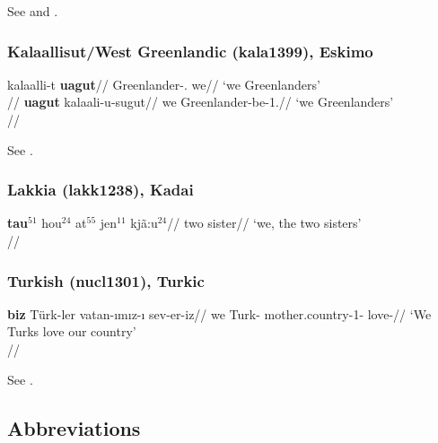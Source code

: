 \documentclass[A4paper]{article}
\begin{document}
See \citet[284; 292]{sohn1994} and \citet[151--154]{choi2014phd}.


\subsubsection{Kalaallisut/West Greenlandic (kala1399), Eskimo}


\pex
\a
\begingl
\gla kalaalli-t \textbf{uagut}//
\glb Greenlander-\Abs{}.\Pl{} we//
\glft `we Greenlanders'\\{\citep[after][110; gloss extrapolated]{fortescue1984}}//
\endgl
\a
\begingl
\gla \textbf{uagut} kalaali-u-sugut//
\glb we Greenlander-be-1\Pl{}.\Ptcp{}//
\glft `we Greenlanders' \\{\citep[after][257]{fortescue1984}}//
\endgl
\xe

See \citet[110, 253, 256f.]{fortescue1984}.

\subsubsection{Lakkia (lakk1238), Kadai}

\ex 
\begingl
\gla \textbf{tau$^{51}$} hou$^{24}$ {\textglotstop{}at$^{55}$ jen$^{11}$ kjã:u$^{24}$}//
\Pl{} two sister//
\glft `we, the two sisters'\\\citep[137, (40)]{fan2019}//
\endgl
\xe

\subsubsection{Turkish (nucl1301), Turkic}

\ex 
\begingl
\gla \textbf{biz} Türk-ler vatan-{\i}m{\i}z-{\i} sev-er-iz//
\glb we Turk-\Pl{} mother.country-1\Pl-\Acc{} love-\Pl{}//
\glft `We Turks love our country'\\\citep[297, (1075)]{kornfilt1997}//
\endgl
\xe

See \citet[288, 297f.]{kornfilt1997}.


\subsection*{Abbreviations}

\printglosses 




\end{document}
